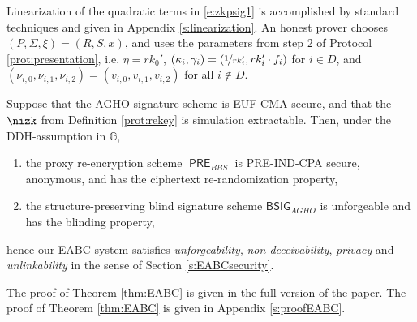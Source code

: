 \documentclass[runningheads]{llncs}
\DeclareMathOperator{\BSIG}{\ensuremath{\mathsf{BSIG}}}
\DeclareMathOperator{\PRE}{\ensuremath{\mathsf{PRE}}}
\DeclareMathOperator{\COM}{\ensuremath{\mathsf{COM}}}
\begin{document}
\else
Linearization of the quadratic terms in \eqref{e:zkpsig1} is accomplished by standard techniques and given in Appendix \ref{s:linearization}.
An honest prover chooses $(P,\Sigma, \xi) = (R,S,x)$, and uses the parameters from step 2 of Protocol \ref{prot:presentation}, i.e.  $\eta = rk_0'$, $\left(\kappa_{i},\gamma_{i}\right) = \left(\nicefrac{1}{rk_i'}, rk_i'\cdot f_{i}\right)$ for $i\in D$, and $\left(\nu_{i,0},\nu_{i,1},\nu_{i,2}\right) = \left(v_{i,0}, v_{i,1}, v_{i,2}\right)$ for all $i\not\in D$.
\fi



\begin{theorem}
\label{thm:EABC}
Suppose that the AGHO signature scheme is EUF-CMA secure, and that 
the $\nizk$ from Definition \ref{prot:rekey} is simulation extractable.
Then, under the DDH-assumption in $\mathbb G$, 
\begin{enumerate}
\item
\label{thm:EABC:i}
the proxy re-encryption scheme $\PRE_{BBS}$ is PRE-IND-CPA secure, anonymous, and has the ciphertext re-randomization property,
\item
\label{thm:EABC:ii}
the structure-preserving blind signature scheme $\mathsf{BSIG}_{AGHO}$ is unforgeable and has the blinding property,
\end{enumerate}
hence our EABC system satisfies \emph{unforgeability}, \emph{non-deceivability}, \emph{privacy} and \emph{unlinkability}  in the sense of  Section \ref{s:EABCsecurity}.
\end{theorem}
\ifCANS
The proof of Theorem \ref{thm:EABC} is given in the full version of the paper.
\else
The proof of Theorem \ref{thm:EABC} is given in Appendix \ref{s:proofEABC}.
\fi
\end{document}
